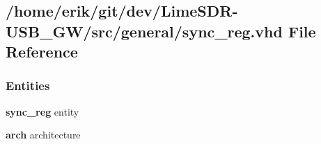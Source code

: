 \subsection{/home/erik/git/dev/\+Lime\+S\+D\+R-\/\+U\+S\+B\+\_\+\+G\+W/src/general/sync\+\_\+reg.vhd File Reference}
\label{sync__reg_8vhd}
\subsubsection*{Entities}
\begin{DoxyCompactItemize}
\item 
{\bf sync\+\_\+reg} entity
\item 
{\bf arch} architecture
\end{DoxyCompactItemize}
